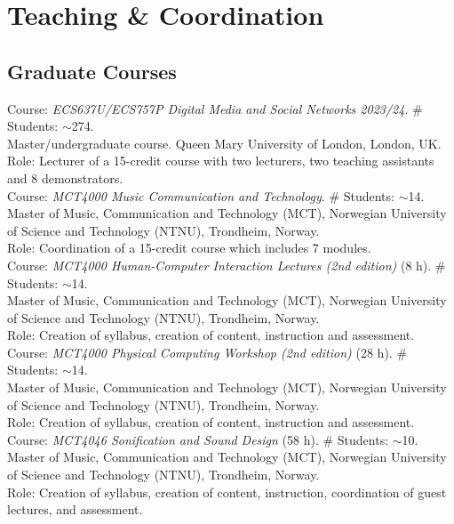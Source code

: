 \documentclass[10pt, a4paper]{article}
\newcommand{\years}[1]{\marginnote{\scriptsize #1}}
\begin{document}
{{%

\section*{Teaching \& Coordination}

\subsection*{Graduate Courses}
\noindent

\years{01/2024}Course: \emph{ECS637U/ECS757P Digital Media and Social Networks 2023/24}. \# Students: $\sim$274. \\
Master/undergraduate course. Queen Mary University of London, London, UK.\\
Role: Lecturer of a 15-credit course with two lecturers, two teaching assistants and 8 demonstrators.\\ 
\years{10/2019}Course: \emph{MCT4000 Music Communication and Technology}. \# Students: $\sim$14. \\
Master of Music, Communication and Technology (MCT), Norwegian University of Science and Technology (NTNU), Trondheim, Norway.\\ 
Role: Coordination of a 15-credit course which includes 7 modules.\\
\years{10/2019}Course: \emph{MCT4000 Human-Computer Interaction Lectures (2nd edition)} (8 h). \# Students: $\sim$14. \\
Master of Music, Communication and Technology (MCT), Norwegian University of Science and Technology (NTNU), Trondheim, Norway.\\ 
Role: Creation of syllabus, creation of content, instruction and assessment.\\
\years{10/2019}Course: \emph{MCT4000 Physical Computing Workshop (2nd edition)} (28 h). \# Students: $\sim$14. \\
Master of Music, Communication and Technology (MCT), Norwegian University of Science and Technology (NTNU), Trondheim, Norway.\\ 
Role: Creation of syllabus, creation of content, instruction and assessment.\\
\years{1/2019}Course: \emph{MCT4046 Sonification and Sound Design} (58 h). \# Students: $\sim$10. \\
Master of Music, Communication and Technology (MCT), Norwegian University of Science and Technology (NTNU), Trondheim, Norway.\\ 
Role: Creation of syllabus, creation of content, instruction, coordination of guest lectures, and assessment.\\
}}
\end{document}
